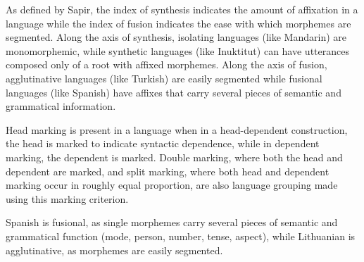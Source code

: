 \documentclass{article}
\begin{document}
\clearpage

\problem
As defined by Sapir, the index of synthesis indicates the amount of affixation in a language while the index of fusion indicates the ease with which morphemes are segmented. Along the axis of synthesis, isolating languages (like Mandarin) are monomorphemic, while synthetic languages (like Inuktitut) can have utterances composed only of a root with affixed morphemes. Along the axis of fusion, agglutinative languages (like Turkish) are easily segmented while fusional languages (like Spanish) have affixes that carry several pieces of semantic and grammatical information.

\clearpage

\problem
Head marking is present in a language when in a head-dependent construction, the head is marked to indicate syntactic dependence, while in dependent marking, the dependent is marked. Double marking, where both the head and dependent are marked, and split marking, where both head and dependent marking occur in roughly equal proportion, are also language grouping made using this marking criterion.

\clearpage

\problem
Spanish is fusional, as single morphemes carry several pieces of semantic and grammatical function (mode, person, number, tense, aspect), while Lithuanian is agglutinative, as morphemes are easily segmented.
\end{document}
